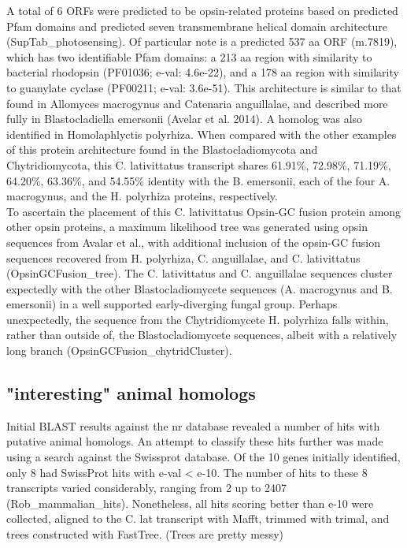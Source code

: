 \indent A total of 6 ORFs were predicted to be opsin-related proteins based on predicted Pfam domains and predicted seven transmembrane helical domain architecture (SupTab\_photosensing). Of particular note is a predicted 537 aa ORF (m.7819), which has two identifiable Pfam domains: a 213 aa region with similarity to bacterial rhodopsin (PF01036; e-val: 4.6e-22), and a 178 aa region with similarity to guanylate cyclase (PF00211; e-val: 3.6e-51). This architecture is similar to that found in Allomyces macrogynus and Catenaria anguillalae, and described more fully in Blastocladiella emersonii (Avelar et al. 2014). A homolog was also identified in Homolaphlyctis polyrhiza. When compared with the other examples of this protein architecture found in the Blastocladiomycota and Chytridiomycota, this C. lativittatus transcript shares 61.91\%, 72.98\%, 71.19\%, 64.20\%, 63.36\%, and 54.55\% identity with the B. emersonii, each of the four A. macrogynus, and the H. polyrhiza proteins, respectively.  \\
\indent To ascertain the placement of this C. lativittatus Opsin-GC fusion protein among other opsin proteins, a maximum likelihood tree was generated using opsin sequences from Avalar et al., with additional inclusion of the opsin-GC fusion sequences recovered from H. polyrhiza, C. anguillalae, and C. lativittatus (OpsinGCFusion\_tree). The C. lativittatus and C. anguillalae sequences cluster expectedly with the other Blastocladiomycete sequences (A. macrogynus and B. emersonii) in a well supported early-diverging fungal group. Perhaps unexpectedly, the sequence from the Chytridiomycete H. polyrhiza falls within, rather than outside of, the Blastocladiomycete sequences, albeit with a relatively long branch (OpsinGCFusion\_chytridCluster).\\
\subsection{"interesting" animal homologs}
Initial BLAST results against the nr database revealed a number of hits with putative animal homologs. An attempt to classify these hits further was made using a search against the Swissprot database. Of the 10 genes initially identified, only 8 had SwissProt hits with e-val < e-10. The number of hits to these 8 transcripts varied considerably, ranging from 2 up to 2407 (Rob\_mammalian\_hits). Nonetheless, all hits scoring better than e-10 were collected, aligned to the C. lat transcript with Mafft, trimmed with trimal, and trees constructed with FastTree. (Trees are pretty messy) \\
